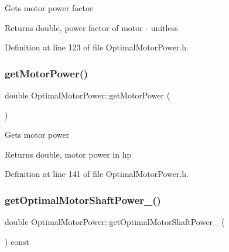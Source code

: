 Gets motor power factor

\begin{DoxyReturn}{Returns}
double, power factor of motor -\/ unitless 
\end{DoxyReturn}


Definition at line 123 of file Optimal\+Motor\+Power.\+h.

\mbox{\label{class_optimal_motor_power_af35a32c24df9198bcf0df5b8f6ea03a9}} 
\subsubsection{\texorpdfstring{get\+Motor\+Power()}{getMotorPower()}}
{\footnotesize\ttfamily double Optimal\+Motor\+Power\+::get\+Motor\+Power (\begin{DoxyParamCaption}{ }\end{DoxyParamCaption})\hspace{0.3cm}{\ttfamily [inline]}}

Gets motor power

\begin{DoxyReturn}{Returns}
double, motor power in hp 
\end{DoxyReturn}


Definition at line 141 of file Optimal\+Motor\+Power.\+h.

\mbox{\label{class_optimal_motor_power_af902365015880d5f11d865465672d7bb}} 
\subsubsection{\texorpdfstring{get\+Optimal\+Motor\+Shaft\+Power\+\_\+()}{getOptimalMotorShaftPower\_()}}
{\footnotesize\ttfamily double Optimal\+Motor\+Power\+::get\+Optimal\+Motor\+Shaft\+Power\+\_\+ (\begin{DoxyParamCaption}{ }\end{DoxyParamCaption}) const\hspace{0.3cm}{\ttfamily [inline]}}

